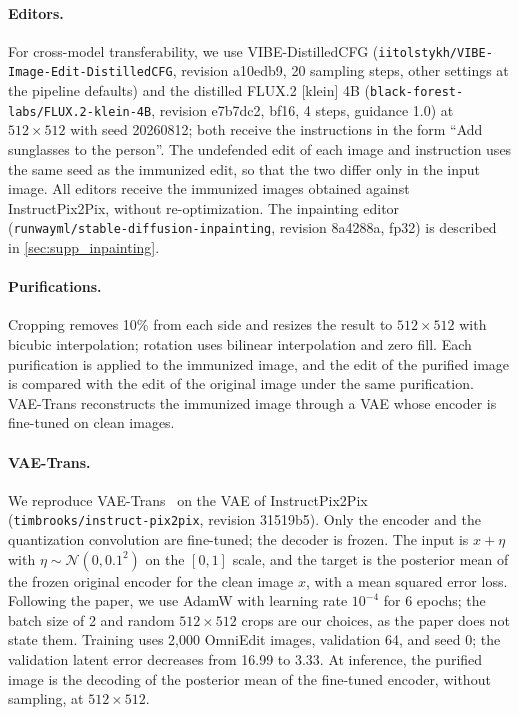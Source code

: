 \paragraph{Editors.} For cross-model transferability, we use VIBE-DistilledCFG (\texttt{iitolstykh/VIBE-Image-Edit-DistilledCFG}, revision a10edb9, 20 sampling steps, other settings at the pipeline defaults) and the distilled FLUX.2 [klein] 4B (\texttt{black-forest-labs/FLUX.2-klein-4B}, revision e7b7dc2, bf16, 4 steps, guidance 1.0) at $512\times512$ with seed 20260812; both receive the instructions in the form ``Add sunglasses to the person''. The undefended edit of each image and instruction uses the same seed as the immunized edit, so that the two differ only in the input image. All editors receive the immunized images obtained against InstructPix2Pix, without re-optimization. The inpainting editor (\texttt{runwayml/stable-diffusion-inpainting}, revision 8a4288a, fp32) is described in \cref{sec:supp_inpainting}.

\paragraph{Purifications.} Cropping removes 10\% from each side and resizes the result to $512\times512$ with bicubic interpolation; rotation uses bilinear interpolation and zero fill. Each purification is applied to the immunized image, and the edit of the purified image is compared with the edit of the original image under the same purification. VAE-Trans reconstructs the immunized image through a VAE whose encoder is fine-tuned on clean images.

\paragraph{VAE-Trans.} We reproduce VAE-Trans~\cite{purifyonce2026} on the VAE of InstructPix2Pix (\texttt{timbrooks/instruct-pix2pix}, revision 31519b5). Only the encoder and the quantization convolution are fine-tuned; the decoder is frozen. The input is $x + \eta$ with $\eta \sim \mathcal{N}(0, 0.1^2)$ on the $[0, 1]$ scale, and the target is the posterior mean of the frozen original encoder for the clean image $x$, with a mean squared error loss. Following the paper, we use AdamW with learning rate $10^{-4}$ for 6 epochs; the batch size of 2 and random $512\times512$ crops are our choices, as the paper does not state them. Training uses 2{,}000 OmniEdit images, validation 64, and seed 0; the validation latent error decreases from 16.99 to 3.33. At inference, the purified image is the decoding of the posterior mean of the fine-tuned encoder, without sampling, at $512\times512$.


